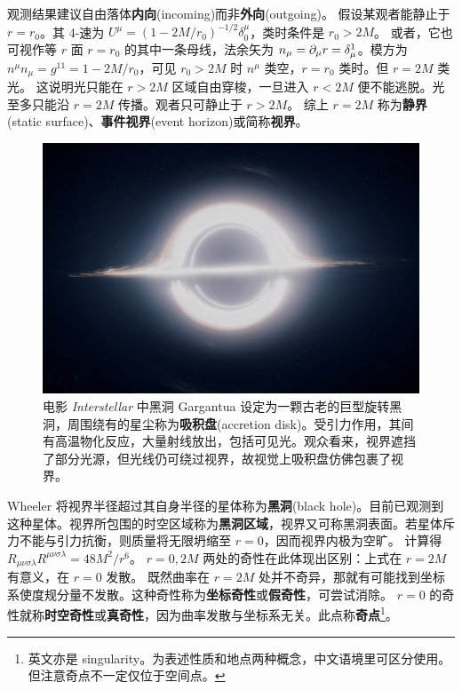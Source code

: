 观测结果建议自由落体\textbf{内向}(incoming)而非\textbf{外向}(outgoing)。
假设某观者能静止于 $r=r_0$。其 4-速为 $U^\mu=(1-2M/r_0)^{-1/2}\delta^\mu_0$，类时条件是 $r_0>2 M$。
或者，它也可视作等 $r$ 面 $r=r_0$ 的其中一条母线，法余矢为 $n_\mu=\partial_\mu r=\delta^1_\mu$。模方为 $n^\mu n_\mu=g^{11}=1-2M/r_0$，可见 $r_0>2M$ 时 $n^\mu$ 类空，$r=r_0$ 类时。但 $r=2M$ 类光。
这说明光只能在 $r>2M$ 区域自由穿梭，一旦进入 $r<2M$ 便不能逃脱。光至多只能沿 $r=2M$ 传播。观者只可静止于 $r>2M$。
综上 $r=2M$ 称为\textbf{静界}(static surface)、\textbf{事件视界}(event horizon)或简称\textbf{视界}。
\begin{figure}[h!]
    \centering
    \includegraphics[width=.7\textwidth]{fig/chpt01/blackhole.jpg}
    \caption{\small 电影 \textit{Interstellar} 中黑洞 Gargantua 设定为一颗古老的巨型旋转黑洞，周围绕有的星尘称为\textbf{吸积盘}(accretion disk)。受引力作用，其间有高温物化反应，大量射线放出，包括可见光。观众看来，视界遮挡了部分光源，但光线仍可绕过视界，故视觉上吸积盘仿佛包裹了视界。}
\end{figure}
Wheeler 将视界半径超过其自身半径的星体称为\textbf{黑洞}(black hole)。目前已观测到这种星体。视界所包围的时空区域称为\textbf{黑洞区域}，视界又可称黑洞表面。若星体斥力不能与引力抗衡，则质量将无限坍缩至 $r=0$，因而视界内极为空旷。
计算得 $R_{\mu\nu\sigma\lambda}R^{\mu\nu\sigma\lambda} = {48 M^2}/{r^6}$。
$r=0,2M$ 两处的奇性在此体现出区别：上式在 $r=2M$ 有意义，在 $r=0$ 发散。
既然曲率在 $r=2M$ 处并不奇异，那就有可能找到坐标系使度规分量不发散。这种奇性称为\textbf{坐标奇性}或\textbf{假奇性}，可尝试消除。
$r=0$ 的奇性就称\textbf{时空奇性}或\textbf{真奇性}，因为曲率发散与坐标系无关。此点称\textbf{奇点}\footnote{英文亦是 singularity。为表述性质和地点两种概念，中文语境里可区分使用。但注意奇点不一定仅位于空间点。}。


